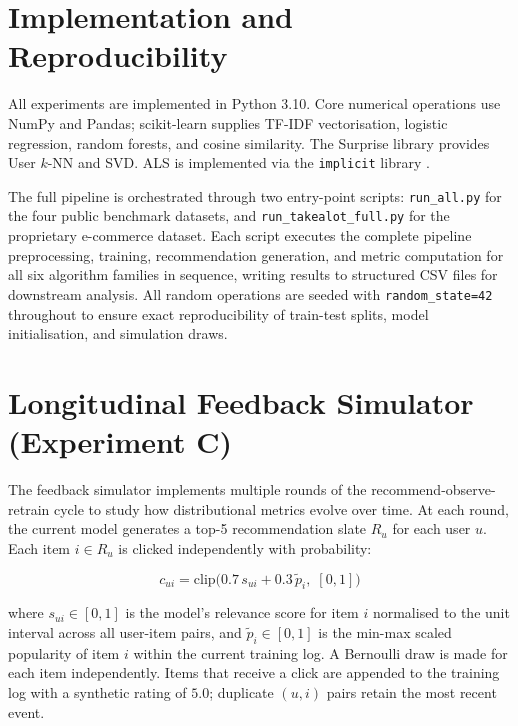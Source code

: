 \documentclass[11pt,a4paper]{report}
\begin{document}
\section{Implementation and Reproducibility}
\label{sec:method_implementation}

All experiments are implemented in Python 3.10. Core numerical operations use NumPy and Pandas; scikit-learn \citep{pedregosa2011scikit} supplies TF-IDF vectorisation, logistic regression, random forests, and cosine similarity. The Surprise library \citep{hug2020surprise} provides User $k$-NN and SVD. ALS is implemented via the \texttt{implicit} library \citep{benfred2018implicit}.

The full pipeline is orchestrated through two entry-point scripts: \texttt{run\_all.py} for the four public benchmark datasets, and \texttt{run\_takealot\_full.py} for the proprietary e-commerce dataset. Each script executes the complete pipeline preprocessing, training, recommendation generation, and metric computation for all six algorithm families in sequence, writing results to structured CSV files for downstream analysis. All random operations are seeded with \texttt{random\_state=42} throughout to ensure exact reproducibility of train-test splits, model initialisation, and simulation draws.

\section{Longitudinal Feedback Simulator (Experiment C)}
\label{sec:method_click}

The feedback simulator implements multiple rounds of the recommend-observe-retrain cycle to study how distributional metrics evolve over time. At each round, the current model generates a top-5 recommendation slate $R_u$ for each user $u$. Each item $i \in R_u$ is clicked independently with probability:

\begin{equation}
  c_{ui} = \mathrm{clip}\bigl(0.7\, s_{ui} + 0.3\, \tilde{p}_i,\;[0,1]\bigr)
\end{equation}

where $s_{ui} \in [0,1]$ is the model's relevance score for item $i$ normalised to the unit interval across all user-item pairs, and $\tilde{p}_i \in [0,1]$ is the min-max scaled popularity of item $i$ within the current training log. A Bernoulli draw is made for each item independently. Items that receive a click are appended to the training log with a synthetic rating of $5.0$; duplicate $(u,i)$ pairs retain the most recent event.
\end{document}
